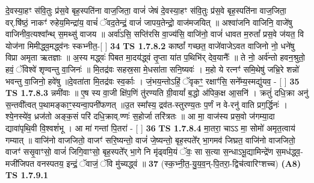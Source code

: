 \documentclass[17pt]{extarticle}
\begin{document}
                  दे॒वस्या॒हꣳ स॑वि॒तुः प्र॑स॒वे बृह॒स्पति॑ना वाज॒जिता॒ वाजं॑ जेषं दे॒वस्या॒हꣳ स॑वि॒तुः प्र॑स॒वे बृह॒स्पति॑ना वाज॒जिता॒ वर्.षि॑ष्ठं॒ नाकꣳ॑ रुहेय॒मिन्द्रा॑य॒ वाचं॑ ॅवद॒तेन्द्रं॒ वाजं॑ जापय॒तेन्द्रो॒ वाज॑मजयित् ॥ अश्वा॑जनि वाजिनि॒ वाजे॑षु वाजिनीव॒त्यश्वा᳚न्थ् स॒मथ्सु॑ वाजय ॥ अर्वा॑ऽसि॒ सप्ति॑रसि वा॒ज्य॑सि॒ वाजि॑नो॒ वाजं॑ धावत म॒रुतां᳚ प्रस॒वे ज॑यत॒ वि योज॑ना मिमीद्ध्व॒मद्ध्व॑नः स्कभ्नीत॒-[ ] \textbf{  34} \newline
                  \newline
                                \textbf{ TS 1.7.8.2} \newline
                  काष्ठां᳚ गच्छत॒ वाजे॑वाजेऽवत वाजिनो नो॒ धने॑षु विप्रा अमृता ऋतज्ञाः ॥ अ॒स्य मद्ध्वः॑ पिबत मा॒दय॑द्ध्वं तृ॒प्ता या॑त प॒थिभि॑र् देव॒यानैः᳚ ॥ ते नो॒ अर्व॑न्तो हवन॒श्रुतो॒ हवं॒ ॅविश्वे॑ शृण्वन्तु वा॒जिनः॑ ॥ मि॒तद्र॑वः सहस्र॒सा मे॒धसा॑ता सनि॒ष्यवः॑ । म॒हो ये रत्नꣳ॑ समि॒थेषु॑ जभ्रि॒रे शन्नो॑ भवन्तु वा॒जिनो॒ हवे॑षु ॥दे॒वता॑ता मि॒तद्र॑वः स्व॒र्काः । जं॒भय॒न्तोऽहिं॒ ॅवृकꣳ॒॒ रक्षाꣳ॑सि॒ सने᳚म्य॒स्मद्यु॑यव॒ - [ ] \textbf{  35} \newline
                  \newline
                                \textbf{ TS 1.7.8.3} \newline
                  न्नमी॑वाः ॥ ए॒ष स्य वा॒जी क्षि॑प॒णिं तु॑रण्यति ग्री॒वायां᳚ ब॒द्धो अ॑पिक॒क्ष आ॒सनि॑ । क्रतुं॑ दधि॒क्रा अनु॑ स॒न्तवी᳚त्वत् प॒थामङ्काꣳ॒॒स्यन्वा॒पनी॑फणत् ॥उ॒त स्मा᳚स्य॒ द्रव॑त-स्तुरण्य॒तः प॒र्णं न वे-रनु॑ वाति प्रग॒र्द्धिनः॑ । श्ये॒नस्ये॑व॒ ध्रज॑तो अङ्क॒सं परि॑ दधि॒क्राव्.ण्णः॑ स॒होर्जा तरि॑त्रतः ॥ आ मा॒ वाज॑स्य प्रस॒वो ज॑गम्या॒दा द्यावा॑पृथि॒वी वि॒श्वशं॑भू । आ मा॑ गन्तां पि॒तरा॑ - [ ] \textbf{  36} \newline
                  \newline
                                \textbf{ TS 1.7.8.4} \newline
                  मा॒तरा॒ चाऽऽ मा॒ सोमो॑ अमृत॒त्वाय॑ गम्यात् ॥ वाजि॑नो वाजजितो॒ वाजꣳ॑ सरि॒ष्यन्तो॒ वाजं॑ जे॒ष्यन्तो॒ बृह॒स्पते᳚र् भा॒गमव॑ जिघ्रत॒ वाजि॑नो वाजजितो॒ वाजꣳ॑ ससृ॒वाꣳसो॒ वाजं॑ जिगि॒वाꣳसो॒ बृह॒स्पते᳚र् भा॒गे नि मृ॑ढ्वमि॒यं ॅवः॒ सा स॒त्या स॒न्धाऽभू॒द्यामिन्द्रे॑ण स॒मध॑द्ध्व॒-मजी॑जिपत वनस्पतय॒ इन्द्रं॒ ॅवाजं॒ ॅवि मु॑च्यद्ध्वं ॥ \textbf{  37} \newline
                  \newline
                      (स्क॒भ्नी॒त॒-यु॒य॒व॒न्-पि॒तरा॒-द्विच॑त्वारिꣳशच्च)  \textbf{(A8)} \newline \newline
                                        \textbf{ TS 1.7.9.1} \newline
\end{document}
